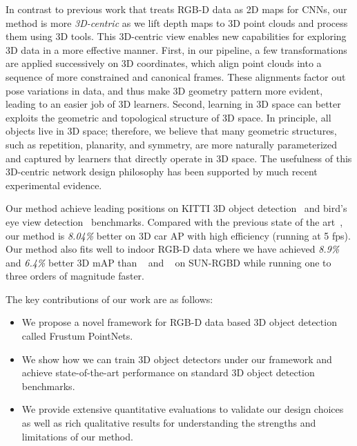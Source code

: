 \documentclass[10pt,twocolumn,letterpaper]{article}
\newcommand{\denselist}{\itemsep 0pt\parsep=0pt\partopsep0pt\vspace{-\topsep}}
\newcommand{\bitem}{\begin{itemize}\denselist}
\newcommand{\eitem}{\end{itemize}}
\begin{document}
In contrast to previous work that treats RGB-D data as 2D maps for CNNs, our method is more \emph{3D-centric} as we lift depth maps to 3D point clouds and process them using 3D tools. This 3D-centric view enables new capabilities for exploring 3D data in a more effective manner. First, in our pipeline, a few transformations are applied successively on 3D coordinates, which align point clouds into a sequence of more constrained and canonical frames.
These alignments factor out pose variations in data, and thus make 3D geometry pattern more evident, leading to an easier job of 3D learners.
Second, learning in 3D space can better exploits the geometric and topological structure of 3D space.
In principle, all objects live in 3D space; therefore, we believe that many geometric structures, such as repetition, planarity, and symmetry, are more naturally parameterized and captured by learners that directly operate in 3D space. The usefulness of this 3D-centric network design philosophy has been supported by much recent experimental evidence.


Our method achieve leading positions on KITTI 3D object detection~\cite{kitti-3d-detection} and bird's eye view detection~\cite{kitti-3d-localization} benchmarks.
Compared with the previous state of the art~\cite{cvpr17chen}, our method is \emph{8.04\%} better on 3D car AP with high efficiency (running at 5 fps). Our method also fits well to indoor RGB-D data where we have achieved \emph{8.9\%} and \emph{6.4\%} better 3D mAP than ~\cite{lahoud20172d} and ~\cite{ren2016three} on SUN-RGBD while running one to three orders of magnitude faster.





The key contributions of our work are as follows:
\bitem
    \item We propose a novel framework for RGB-D data based 3D object detection called Frustum PointNets.
    \item We show how we can train 3D object detectors under our framework and achieve state-of-the-art performance on standard 3D object detection benchmarks.
    \item We provide extensive quantitative evaluations to validate our design choices as well as rich qualitative results for understanding the strengths and limitations of our method.
\eitem
\end{document}
